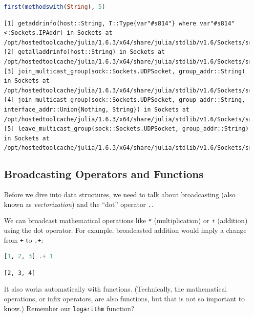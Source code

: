 \documentclass[
  notoc %
]{tufte-book}
\newcommand{\passthrough}[1]{#1}
\begin{document}
\begin{lstlisting}[language=Julia]
first(methodswith(String), 5)
\end{lstlisting}

\begin{lstlisting}[language=Output]
[1] getaddrinfo(host::String, T::Type{var"#s814"} where var"#s814"<:Sockets.IPAddr) in Sockets at /opt/hostedtoolcache/julia/1.6.3/x64/share/julia/stdlib/v1.6/Sockets/src/addrinfo.jl:130
[2] getalladdrinfo(host::String) in Sockets at /opt/hostedtoolcache/julia/1.6.3/x64/share/julia/stdlib/v1.6/Sockets/src/addrinfo.jl:66
[3] join_multicast_group(sock::Sockets.UDPSocket, group_addr::String) in Sockets at /opt/hostedtoolcache/julia/1.6.3/x64/share/julia/stdlib/v1.6/Sockets/src/Sockets.jl:761
[4] join_multicast_group(sock::Sockets.UDPSocket, group_addr::String, interface_addr::Union{Nothing, String}) in Sockets at /opt/hostedtoolcache/julia/1.6.3/x64/share/julia/stdlib/v1.6/Sockets/src/Sockets.jl:761
[5] leave_multicast_group(sock::Sockets.UDPSocket, group_addr::String) in Sockets at /opt/hostedtoolcache/julia/1.6.3/x64/share/julia/stdlib/v1.6/Sockets/src/Sockets.jl:780
\end{lstlisting}

\hypertarget{sec:broadcasting}{%
\subsection{Broadcasting Operators and
Functions}\label{sec:broadcasting}}

Before we dive into data structures, we need to talk about broadcasting
(also known as \emph{vectorization}) and the ``dot'' operator
\passthrough{\lstinline!.!}.

We can broadcast mathematical operations like
\passthrough{\lstinline!*!} (multiplication) or
\passthrough{\lstinline!+!} (addition) using the dot operator. For
example, broadcasted addition would imply a change from
\passthrough{\lstinline!+!} to \passthrough{\lstinline!.+!}:

\begin{lstlisting}[language=Julia]
[1, 2, 3] .+ 1
\end{lstlisting}

\begin{lstlisting}[language=Output]
[2, 3, 4]
\end{lstlisting}

It also works automatically with functions. (Technically, the
mathematical operations, or infix operators, are also functions, but
that is not so important to know.) Remember our
\passthrough{\lstinline!logarithm!} function?
\end{document}
